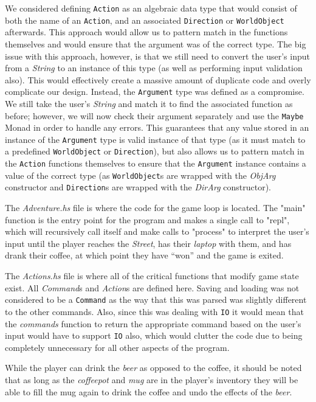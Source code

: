\documentclass[a4paper,]{article}
\begin{document}
We considered defining \verb|Action| as an algebraic data type that would consist of both the name of an \verb|Action|, and an associated \verb|Direction| or \verb|WorldObject| afterwards.
This approach would allow us to pattern match in the functions themselves and would ensure that the argument was of the correct type.
The big issue with this approach, however, is that we still need to convert the user's input from a \textit{String} to an instance of this type (as well as performing input validation also).
This would effectively create a massive amount of duplicate code and overly complicate our design.
Instead, the \verb|Argument| type was defined as a compromise.
We still take the user's \textit{String} and match it to find the associated function as before; however, we will now check their argument separately and use the \verb|Maybe| Monad in order to handle any errors.
This guarantees that any value stored in an instance of the \verb|Argument| type is valid instance of that type (as it must match to a predefined \verb|WorldObject| or \verb|Direction|), but also allows us to pattern match in the \verb|Action| functions themselves to ensure that the \verb|Argument| instance contains a value of the correct type (as \verb|WorldObject|s are wrapped with the \textit{ObjArg} constructor and \verb|Direction|s are wrapped with the \textit{DirArg} constructor).

The \textit{Adventure.hs} file is where the code for the game loop is located. The "main" function is the entry point for the program and makes a single call to "repl", which will recursively call itself and make calls to "process" to interpret the user's input until the player reaches the \textit{Street}, has their \textit{laptop} with them, and has drank their coffee, at which point they have ``won'' and the game is exited.

The \textit{Actions.hs} file is where all of the critical functions that modify game state exist. All \textit{Command}s and \textit{Action}s are defined here.
Saving and loading was not considered to be a \verb|Command| as the way that this was parsed was slightly different to the other commands.
Also, since this was dealing with \verb|IO| it would mean that the \textit{commands} function to return the appropriate command based on the user's input would have to support \verb|IO| also, which would clutter the code due to being completely unnecessary for all other aspects of the program.

While the player can drink the \textit{beer} as opposed to the coffee, it should be noted that as long as the \textit{coffeepot} and \textit{mug} are in the player's inventory they will be able to fill the mug again to drink the coffee and undo the effects of the \textit{beer}.
\end{document}
